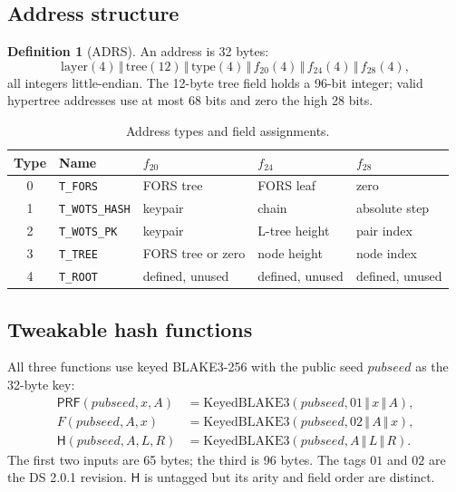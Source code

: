 \documentclass[11pt,a4paper]{article}
\theoremstyle{plain}
\theoremstyle{definition}
\newtheorem{definition}[theorem]{Definition}
\theoremstyle{remark}
\newcommand{\concat}{\,\Vert\,}
\newcommand{\Hash}{\mathsf{H}}
\newcommand{\PRF}{\mathsf{PRF}}
\begin{document}
\subsection{Address structure}

\begin{definition}[ADRS]
An address is 32 bytes:
\[
 \mathrm{layer}(4)\concat\mathrm{tree}(12)\concat
 \mathrm{type}(4)\concat f_{20}(4)\concat f_{24}(4)\concat f_{28}(4),
\]
all integers little-endian.  The 12-byte tree field holds a 96-bit
integer; valid hypertree addresses use at most 68 bits and zero the high
28 bits.
\end{definition}

\begin{table}[t]
\centering
\small
\begin{tabular}{@{}cllll@{}}
\toprule
Type & Name & $f_{20}$ & $f_{24}$ & $f_{28}$ \\
\midrule
0 & \texttt{T\_FORS} & FORS tree & FORS leaf & zero \\
1 & \texttt{T\_WOTS\_HASH} & keypair & chain & absolute step \\
2 & \texttt{T\_WOTS\_PK} & keypair & L-tree height & pair index \\
3 & \texttt{T\_TREE} & FORS tree or zero & node height & node index \\
4 & \texttt{T\_ROOT} & defined, unused & defined, unused & defined, unused \\
\bottomrule
\end{tabular}
\caption{Address types and field assignments.}
\label{tab:adrs}
\end{table}

\subsection{Tweakable hash functions}

All three functions use keyed BLAKE3-256 with the public seed
$\mathit{pubseed}$ as the 32-byte key:
\[
\begin{aligned}
 \PRF(\mathit{pubseed},x,A)
   &=\mathrm{KeyedBLAKE3}(\mathit{pubseed},
     01\concat x\concat A),\\
 F(\mathit{pubseed},A,x)
   &=\mathrm{KeyedBLAKE3}(\mathit{pubseed},
     02\concat A\concat x),\\
 \Hash(\mathit{pubseed},A,L,R)
   &=\mathrm{KeyedBLAKE3}(\mathit{pubseed},
     A\concat L\concat R).
\end{aligned}
\]
The first two inputs are 65 bytes; the third is 96 bytes.  The tags
$01$ and $02$ are the DS 2.0.1 revision.  $\Hash$ is untagged but its
arity and field order are distinct.
\end{document}
